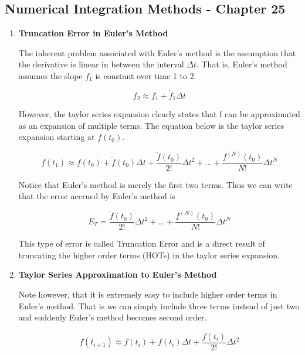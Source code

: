 \subsection{Numerical Integration Methods - Chapter 25}

\begin{enumerate}

\item {\bf Truncation Error in Euler's Method}

  The inherent problem associated with Euler's method is the
  assumption that the derivative is linear in between the interval
  $\Delta t$. That is, Euler's method assumes the slope $\dot{f}_1$ is
  constant over time 1 to 2.

  \begin{equation}
    f_2 \approx f_1 + \dot{f}_1\Delta t 
  \end{equation}

  However, the taylor series expansion clearly states that f can be
  approximated as an expansion of multiple terms. The equation below
  is the taylor series expansion starting at $f(t_0)$.

  \begin{equation}
    f(t_1) \approx f(t_0) + \dot{f}(t_0)\Delta t +
    \frac{\ddot{f}(t_0)}{2!}\Delta t^2 + ... + \frac{f^{(N)}(t_0)}{N!}\Delta t^N
  \end{equation}

  Notice that Euler's method is merely the first two terms. Thus we
  can write that the error accrued by Euler's method is

  \begin{equation}
    E_{T} = \frac{\ddot{f}(t_0)}{2!}\Delta t^2 + ... + \frac{f^{(N)}(t_0)}{N!}\Delta t^N
  \end{equation}

  This type of error is called Truncation Error and is a direct result
  of truncating the higher order terms (HOTs) in the taylor series
  expansion. 

\item {\bf Taylor Series Approximation to Euler's Method}

  Note however, that it is extremely easy to include higher order
  terms in Euler's method. That is we can simply include three terms
  instead of just two and suddenly Euler's method becomes second
  order.

  \begin{equation}
    f(t_{i+1}) \approx f(t_i) + \dot{f}(t_i)\Delta t +
    \frac{\ddot{f}(t_i)}{2!}\Delta t^2
  \end{equation}


\end{enumerate}
